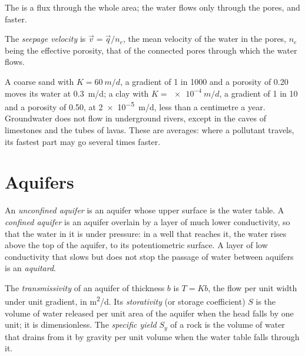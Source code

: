 The  is a flux through the whole area; the water flows
only through the pores, and faster.

\begin{definition}\label{def:b3:hydrogeology:seepage}
The \emph{seepage velocity} is $\vec v = \vec
q/n_e$, the mean velocity of the water in the pores, $n_e$ being the
effective porosity, that of the connected pores through which the water
flows.
\end{definition}

A coarse sand with $K = \qty{60}{m/d}$, a gradient of 1 in 1000 and a
porosity of 0.20 moves its water at \qty{0.3}{m/d}; a clay with $K =
\qty{e-4}{m/d}$, a gradient of 1 in 10 and a porosity of 0.50, at
\qty{2e-5}{m/d}, less than a centimetre a year. Groundwater does not flow
in underground rivers, except in the caves of limestones and the tubes of
lavas. These are averages: where a pollutant travels, its fastest part may
go several times faster.

\section{Aquifers}\label{sec:b3:hydrogeology:aquifers}

\begin{definition}\label{def:b3:hydrogeology:aquifer-types}
An \emph{unconfined aquifer} is an aquifer whose
upper surface is the water table. A \emph{confined
aquifer} is an aquifer overlain by a layer of much
lower conductivity, so that the water in it is under pressure: in a well
that reaches it, the water rises above the top of the aquifer, to its
potentiometric surface. A layer of low conductivity that slows but does not
stop the passage of water between aquifers is an
\emph{aquitard}.
\end{definition}

\begin{definition}\label{def:b3:hydrogeology:storage}
The \emph{transmissivity} of an aquifer of thickness
$b$ is $T = Kb$, the flow per unit width under unit gradient, in
\unit{m^2/d}. Its \emph{storativity} (or storage
coefficient) $S$ is the volume of water released per unit area of the
aquifer when the head falls by one unit; it is dimensionless. The
\emph{specific yield} $S_y$ of a rock is the volume
of water that drains from it by gravity per unit volume when the water
table falls through it.
\end{definition}

